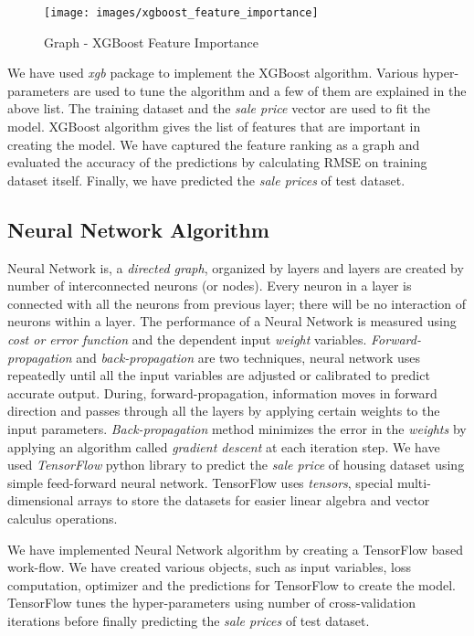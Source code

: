 \documentclass[sigconf]{acmart}
\begin{document}
	\begin{figure}[htb]
		\centering
		\texttt{[image: images/xgboost\_feature\_importance]}	
		\caption{Graph - XGBoost Feature Importance} \label{fig:xgb-feature-imp} 
	\end{figure}

    We have used {\em xgb} package to implement the XGBoost algorithm. Various hyper-parameters are used to tune the algorithm and a few of them are explained in the above list. The training dataset and the {\em sale price} vector are used to fit the model. XGBoost algorithm gives the list of features that are important in creating the model. We have captured the feature ranking as a graph and evaluated the accuracy of the predictions by calculating RMSE on training dataset itself. Finally, we have predicted the {\em sale prices} of test dataset.
    
	\subsection{Neural Network Algorithm}
	Neural Network is, a {\em directed graph}, organized by layers and layers are created by number of interconnected neurons (or nodes). Every neuron in a layer is connected with all the neurons from previous layer; there will be no interaction of neurons within a layer. The performance of a Neural Network is measured using {\em cost or error function} and the dependent input {\em weight} variables. {\em Forward-propagation} and {\em back-propagation} are two techniques, neural network uses repeatedly until all the input variables are adjusted or calibrated to predict accurate output. During, forward-propagation, information moves in forward direction and passes through all the layers by applying certain weights to the input parameters. {\em Back-propagation} method minimizes the error in the {\em weights} by applying an algorithm called {\em gradient descent} at each iteration step. We have used {\em TensorFlow} python library to predict the {\em sale price} of housing dataset using simple feed-forward neural network. TensorFlow uses {\em tensors}, special multi-dimensional arrays to store the datasets for easier linear algebra and vector calculus operations.
	
	We have implemented Neural Network algorithm by creating a TensorFlow based work-flow. We have created various objects, such as input variables, loss computation, optimizer and the predictions for TensorFlow to create the model. TensorFlow tunes the hyper-parameters using number of cross-validation iterations before finally predicting the {\em sale prices} of test dataset.
			
\end{document}
